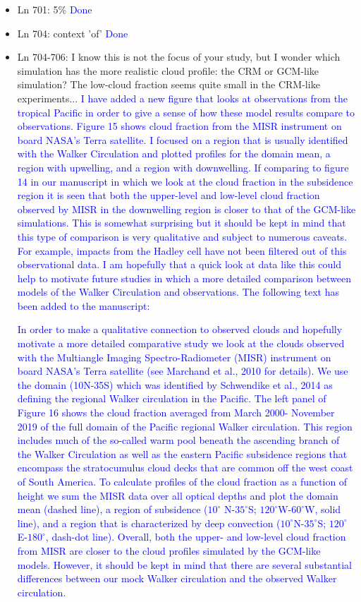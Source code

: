 \documentclass[draft]{agujournal2019}
\begin{document}
\begin{itemize}
  \item Ln 701: 5\%
  \textcolor{blue}{Done}
  
  \item Ln 704: context 'of' 
  \textcolor{blue}{Done}
  
  \item Ln 704-706: I know this is not the focus of your study, but I wonder which simulation has the more realistic cloud profile: the CRM or GCM-like simulation? The low-cloud fraction seems quite small in the CRM-like experiments...
  \textcolor{blue}{I have added a new figure that looks at observations from the tropical Pacific in order to give a sense of how these model results compare to observations.  
  Figure 15 shows cloud fraction from the MISR instrument on board NASA's Terra satellite.  I focused on a region that is usually identified with the Walker Circulation and plotted profiles for the domain mean, a region with upwelling, and a region with downwelling.  If comparing to figure 14 in our manuscript in which we look at the cloud fraction in the subsidence 
  region it is seen that both the upper-level and low-level cloud fraction observed by MISR in the downwelling region is closer to that of the GCM-like simulations.  This is 
  somewhat surprising but it should be kept in mind that this type of comparison is very qualitative and subject to numerous caveats.  For example, impacts from the Hadley cell 
  have not been filtered out of this observational data.  I am hopefully that a quick look at data like this could help to motivate future studies in which a more detailed comparison 
  between models of the Walker Circulation and observations.  The following text has been added to the manuscript:}
  
  \textcolor{blue}{In order to make a qualitative connection to observed clouds and hopefully motivate a more detailed comparative 
study we look 
at the clouds observed with the Multiangle Imaging Spectro-Radiometer (MISR) instrument on board NASA's Terra satellite (see 
Marchand et al., 2010 for details).  We use the domain (10N-35S) which was identified by Schwendike et al., 2014 as defining the 
regional Walker circulation in the Pacific.  The left panel of Figure 16 shows the cloud fraction averaged from March 2000-
November 2019 of the full domain of the Pacific regional Walker circulation.  This region includes much of the so-called warm pool 
beneath the ascending branch of the Walker Circulation as well as the eastern Pacific subsidence regions that encompass the 
stratocumulus cloud decks that are common off the west coast of South America.   To calculate profiles of the cloud fraction as a 
function of height we sum the MISR data over all optical depths  and plot the domain mean (dashed line), a region of subsidence 
($10^\circ$ N-$35^\circ$S; $120^\circ$W-$60^\circ$W, solid line), and a region that is characterized by deep 
convection ($10^\circ$N-$35^\circ$S; $120^\circ$E-$180^\circ$, dash-dot line).  Overall, both the upper- and low-level cloud fraction 
from MISR are closer to the cloud profiles simulated by the GCM-like models.  However, it should be kept in mind that there are 
several substantial differences between our mock Walker circulation and the observed Walker circulation.}
    

\end{itemize}
\end{document}
